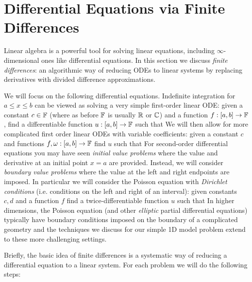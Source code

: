 
\section{Differential Equations via Finite Differences}
Linear algebra is a powerful tool for solving linear equations, including \ensuremath{\infty}-dimensional ones like differential equations. In this section we discuss \emph{finite differences}: an algorithmic way of reducing ODEs to linear systems by replacing derivatives with divided difference approximations. 

We will focus on the following differential equations. Indefinite integration for $a \ensuremath{\leq} x \ensuremath{\leq} b$ can be viewed as solving a very simple first-order linear ODE: given a constant $c \in {\mathbb F}$ (where as before ${\mathbb F}$ is usually ${\mathbb R}$ or ${\mathbb C}$) and a function $f : [a,b] \rightarrow {\mathbb F}$, find a differentiable function $u : [a,b] \rightarrow {\mathbb F}$ such that
We will then allow for more complicated first order linear ODEs with variable coefficients: given  a constant $c$ and functions $f,\omega : [a,b] \rightarrow {\mathbb F}$ find $u$ such that
For second-order differential equations you may have seen \emph{initial value problems} where the value and derivative at an initial point $x=a$ are provided.  Instead, we will consider \emph{boundary value problems} where the value at the left and right endpoints are imposed. In particular we will consider the Poisson equation with \emph{Dirichlet conditions} (i.e. conditions on the left and right of an interval): given constants $c,d$ and a function $f$ find a twice-differentiable function $u$ such that
In higher dimensions, the Poisson equation (and other \emph{elliptic} partial differential equations) typically have boundary conditions imposed on the boundary of a complicated geometry  and the techniques we discuss for our simple 1D model problem extend to these more challenging settings.

Briefly, the basic idea of finite differences is a systematic way of reducing a differential equation to a linear system. For each problem we will do the following steps:

